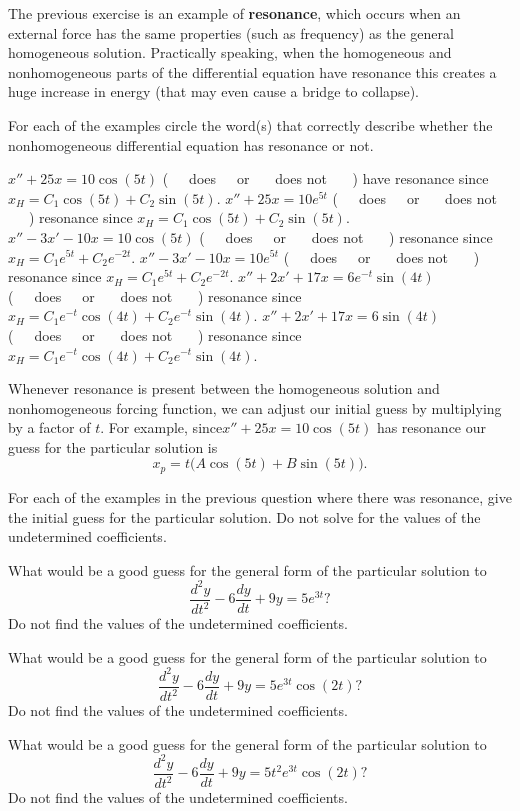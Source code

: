 \clearpage

The previous exercise is an example of \textbf{resonance}, which occurs when an external force has the same properties (such as frequency) as the general homogeneous solution. Practically speaking, when the homogeneous and nonhomogeneous parts of the differential equation have resonance this creates a huge increase in energy (that may even cause a bridge to collapse). 


\begin{enumerate}[resume]
\ii For each of the examples circle the word(s) that correctly describe whether the nonhomogeneous differential equation has resonance or not.

\bb
\ii $x''+25x=10\cos(5t)$ (\ \ \ does\ \ \  or \ \ \ does not \ \ \ ) have resonance since $x_H = C_1\cos{(5t)}+ C_2 \sin{(5t)}$.\bs
\ii $x''+25x=10e^{5t}$  (\ \ \ does\ \ \  or \ \ \ does not \ \ \ ) resonance since $x_H = C_1\cos{(5t)}+ C_2 \sin{(5t)}$. \bs
\ii $x''-3x'-10x=10\cos(5t)$  (\ \ \ does\ \ \  or \ \ \ does not \ \ \ ) resonance since $x_H = C_1e^{5t}+ C_2 e^{-2t}$. \bs
\ii $x''-3x'-10x=10e^{5t}$  (\ \ \ does\ \ \  or \ \ \ does not \ \ \ ) resonance since $x_H = C_1e^{5t}+ C_2 e^{-2t}$. \bs
\ii $x''+2x'+ 17x=6e^{-t} \sin{(4t)} $  (\ \ \ does\ \ \  or \ \ \ does not \ \ \ ) resonance since $x_H = C_1e^{-t}\cos{(4t)}+ C_2 e^{-t}\sin{(4t)}$. \bs
\ii $x''+2x'+ 17x=6 \sin{(4t)} $  (\ \ \ does\ \ \  or \ \ \ does not \ \ \ ) resonance since $x_H = C_1e^{-t}\cos{(4t)}+ C_2 e^{-t}\sin{(4t)}$. \bs
\ee

Whenever resonance is present between the homogeneous solution and nonhomogeneous forcing function, we can adjust
our initial guess by multiplying by a factor of $t$. For example, since\newline $x''+25x=10\cos(5t)$ has resonance our guess for the particular solution is
\[ x_p = t \big(  A\cos{(5t)}+ B \sin{(5t)} \big).\]

\ii For each of the examples in the previous question where there was resonance, give the initial guess for the particular solution. Do not solve for the values of the undetermined coefficients.

\vfill

\clearpage


\ii What would be a good guess for the general form of the particular solution to
\[ \frac{d^2y}{dt^2}-6\frac{dy}{dt}+9y=5e^{3t} \mbox{?}\]
Do not find the values of the undetermined coefficients. \vfill

\ii What would be a good guess for the general form of the particular solution to
\[ \frac{d^2y}{dt^2}-6\frac{dy}{dt}+9y=5e^{3t}\cos{(2t)} \mbox{?}\]
Do not find the values of the undetermined coefficients.  \vfill

\ii What would be a good guess for the general form of the particular solution to
\[ \frac{d^2y}{dt^2}-6\frac{dy}{dt}+9y=5t^2e^{3t}\cos{(2t)} \mbox{?}\]
Do not find the values of the undetermined coefficients.  \vfill



\end{enumerate}



